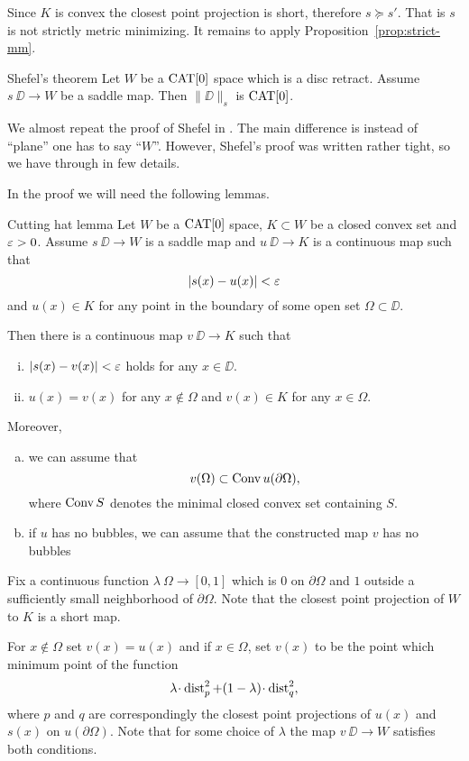 \documentclass[a4paper,10pt]{amsart}
\begin{document}
Since $K$ is convex the closest point projection is short,
therefore $s\succcurlyeq s'$.
That is $s$ is not strictly metric minimizing.
It remains to apply Proposition~\ref{prop:strict-mm}.
\qeds


\begin{thm}{Shefel's theorem}\label{thm:shefel-2D}
Let $W$ be a $\mathop{\rm CAT}\nolimits[0]$ space which is a disc retract.
Assume $s\:\DD\to W$ be a saddle map. 
Then $\|\DD\|_s$ is $\mathop{\rm CAT}\nolimits[0]$.
\end{thm}

We almost repeat the proof of Shefel in \cite{shefel-2D}.
The main difference is instead of ``plane'' one has to say ``$W$''.
However, Shefel's proof was written rather tight, so we have through in few details.

In the proof we will need the following lemmas.

\begin{thm}{Cutting hat lemma}\label{lem:cutting-hat}
Let 
$W$ be a $\mathop{\rm CAT}\nolimits[0]$ space, 
$K\subset W$ be a closed convex set 
and $\varepsilon>0$.
Assume $s\:\DD\to W$ is a saddle map 
and $u\:\DD\to K$ is a continuous map such that 
\[|s(x)-u(x)|<\varepsilon\]
and $u(x)\in K$ for any point in the boundary of some open set $\Omega\subset \DD$.

Then there is a continuous map $v\:\DD\to K$ such that 
\begin{enumerate}[(i)]
\item $|s(x)-v(x)|<\varepsilon$ holds for any $x\in\DD$.
\item $u(x)=v(x)$ for any $x\notin\Omega$ and
$v(x)\in K$ for any $x\in\Omega$.
\end{enumerate}

Moreover,
\begin{enumerate}[(a)]
\item we can assume that \[v(\Omega)\subset \mathop{\rm Conv}\nolimits u(\partial\Omega),\]
where $\mathop{\rm Conv}\nolimits S$ denotes the minimal closed convex set containing $S$.
\item\label{lem:cutting-hat:b} if $u$ has no bubbles, we can assume that the constructed map $v$ has no bubbles
\end{enumerate}
\end{thm}

Fix a continuous function $\lambda\:\Omega\to [0,1]$
which is $0$ on $\partial \Omega$ and $1$ outside a sufficiently small neighborhood of $\partial \Omega$.
Note that the closest point projection of $W$ to $K$ is a short map.

For $x\notin \Omega$ set $v(x)=u(x)$ and if 
$x\in \Omega$, set $v(x)$ to be the point which minimum point of the function 
\[\lambda\cdot\dist^2_p+(1-\lambda)\cdot\dist^2_q,\]
where $p$ and $q$ are correspondingly the closest point projections of  $u(x)$ and $s(x)$ on $u(\partial\Omega)$.
Note that for some choice of $\lambda$ the map $v\:\DD\to W$ satisfies
both conditions.
\end{document}
